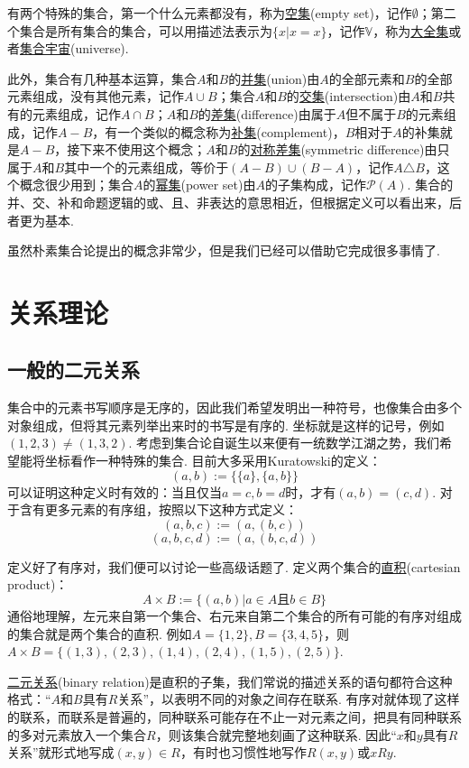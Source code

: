 有两个特殊的集合，第一个什么元素都没有，称为\underline{空集}(empty set)，记作\(\emptyset\)；第二个集合是所有集合的集合，可以用描述法表示为\(\{x|x=x\}\)，记作\(\mathbb{V}\)，称为\underline{大全集}或者\underline{集合宇宙}(universe).

此外，集合有几种基本运算，集合\(A\)和\(B\)的\underline{并集}(union)由\(A\)的全部元素和\(B\)的全部元素组成，没有其他元素，记作\(A \cup B\)；集合\(A\)和\(B\)的\underline{交集}(intersection)由\(A\)和\(B\)共有的元素组成，记作\(A \cap B\)；\(A\)和\(B\)的\underline{差集}(difference)由属于\(A\)但不属于\(B\)的元素组成，记作\(A-B\)，有一个类似的概念称为\underline{补集}(complement)，\(B\)相对于\(A\)的补集就是\(A-B\)，接下来不使用这个概念；\(A\)和\(B\)的\underline{对称差集}(symmetric difference)由只属于\(A\)和\(B\)其中一个的元素组成，等价于\((A-B)\cup(B-A)\)，记作\(A\triangle B\)，这个概念很少用到；集合\(A\)的\underline{幂集}(power set)由\(A\)的子集构成，记作\(\mathcal{P}(A)\). 集合的并、交、补和命题逻辑的或、且、非表达的意思相近，但根据定义可以看出来，后者更为基本.

虽然朴素集合论提出的概念非常少，但是我们已经可以借助它完成很多事情了.

\section{关系理论}

\subsection{一般的二元关系}

集合中的元素书写顺序是无序的，因此我们希望发明出一种符号，也像集合由多个对象组成，但将其元素列举出来时的书写是有序的. 坐标就是这样的记号，例如\((1,2,3)\neq(1,3,2)\). 考虑到集合论自诞生以来便有一统数学江湖之势，我们希望能将坐标看作一种特殊的集合. 目前大多采用Kuratowski的定义：
\[(a,b) := \{\{a\},\{a,b\}\}\]
可以证明这种定义时有效的：当且仅当\(a=c,b=d\)时，才有\((a,b)=(c,d)\). 对于含有更多元素的有序组，按照以下这种方式定义：
\[(a,b,c):=(a,(b,c))\]
\[(a,b,c,d):=(a,(b,c,d))\]

定义好了有序对，我们便可以讨论一些高级话题了. 定义两个集合的\underline{直积}(cartesian product)：
\[A \times B := \{(a,b) | a \in A \mbox{且} b \in B\}\]
通俗地理解，左元来自第一个集合、右元来自第二个集合的所有可能的有序对组成的集合就是两个集合的直积. 例如\(A=\{1,2\},B=\{3,4,5\}\)，则\(A\times B=\{(1,3),( 2,3),(1,4),(2,4),(1,5),(2,5)\}\).

\underline{二元关系}(binary relation)是直积的子集，我们常说的描述关系的语句都符合这种格式：“\(A\)和\(B\)具有\(R\)关系”，以表明不同的对象之间存在联系. 有序对就体现了这样的联系，而联系是普遍的，同种联系可能存在不止一对元素之间，把具有同种联系的多对元素放入一个集合\(R\)，则该集合就完整地刻画了这种联系. 因此“\(x\)和\(y\)具有\(R\)关系”就形式地写成\((x,y) \in R\)，有时也习惯性地写作\(R(x,y)\)或\(xRy\).

